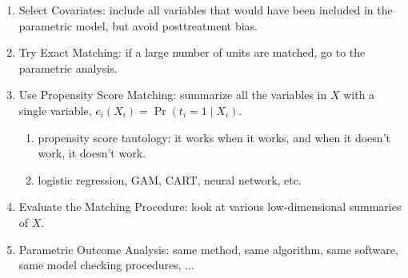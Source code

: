 \documentclass[20pt,landscape,pdftex]{foils}
\begin{document}
\begin{enumerate}
\item Select Covariates: include all variables that would have been
  included in the parametric model, but avoid posttreatment
  bias.\pause
  
\item Try Exact Matching: if a large number of units are matched, go
  to the parametric analysis.\pause
  
\item Use Propensity Score Matching: summarize all the variables in
  $X$ with a single variable, $e_i(X_i)=\Pr(t_i=1\mid X_i)$.\pause
  
  \begin{enumerate}
  \item propensity score tautology: it works when it works, and when
    it doesn't work, it doesn't work.\pause

  \item logistic regression, GAM, CART, neural network, etc.\pause
    
  \end{enumerate}

\item Evaluate the Matching Procedure: look at various low-dimensional
  summaries of $X$.\pause
\item Parametric Outcome Analysis: same method, same algorithm, same
  software, same model checking procedures, ... \pause
\end{enumerate}
\end{document}
